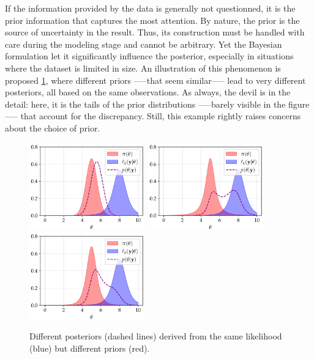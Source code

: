 If the information provided by the data is generally not questionned, it is the prior information that captures the most attention. By nature, the prior is the source of uncertainty in the result. Thus, its construction must be handled with care during the modeling stage and cannot be arbitrary. Yet the Bayesian formulation 
let it significantly influence   the posterior, especially in situations where the dataset is limited in size. 
An illustration of this phenomenon is proposed \cref{fig:intro-english:intro-differentsposteriors}, where different priors —--that seem similar—-- lead to very different posteriors, all based on the same observations. As always, the devil is in the detail: here, it is the tails of the prior distributions —--barely visible in the figure—-- that account for the discrepancy. Still, this example rightly raises concerns about the choice of prior.


\begin{figure}[h]
    \centering
    \includegraphics[width=5cm]{figures/intro/posterior1.pdf}
    \includegraphics[width=5cm]{figures/intro/posterior2.pdf}
    \includegraphics[width=5cm]{figures/intro/posterior3.pdf}   
    \caption{Different posteriors (dashed lines) derived from the same likelihood (blue) but different priors (red).%
    }
    \label{fig:intro-english:intro-differentsposteriors}
\end{figure}

